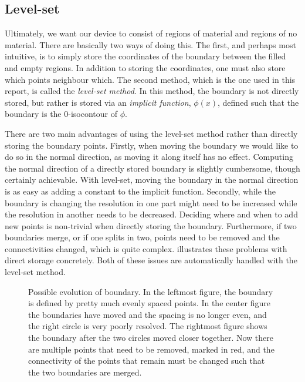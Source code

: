 

\subsection{Level-set}\label{sec:level-set}

Ultimately, we want our device to consist of regions of material and regions of
no material.
There are basically two ways of doing this.
The first, and perhaps most intuitive,
is to simply store the coordinates of the boundary between the filled and empty
regions.
In addition to storing the coordinates, one must also store which points
neighbour which.
The second method, which is the one used in this report, is called
the \emph{level-set method}.
In this method, the boundary is not directly stored, but rather is stored via an
\emph{implicit function}, $\phi(x)$, defined such that the boundary is the
0-isocontour of $\phi$.

There are two main advantages of using the level-set method rather than
directly storing the boundary points.
Firstly, when moving the boundary we would like to do so in the normal
direction, as moving it along itself has no effect.
Computing the normal direction of a directly stored boundary is slightly cumbersome,
though certainly achievable.
With level-set, moving the boundary in the normal direction is as easy as adding
a constant to the implicit function.
Secondly, while the boundary is changing the resolution in one part might need
to be increased while the resolution in another needs to be decreased. Deciding
where and when to add new points is non-trivial when directly storing the
boundary. Furthermore, if two boundaries merge, or if one splits in two, points
need to be removed and the connectivities changed, which is quite complex.
 illustrates these problems with direct storage concretely.
Both of these issues are automatically handled with the level-set method.

\begin{figure}[htpb]
	\centering
	
	\caption{%
		Possible evolution of boundary. In the leftmost figure, the
		boundary is defined by pretty much evenly spaced points. In the center figure
		the boundaries have moved and the spacing is no longer even, and the
		right circle is very poorly resolved.
		The rightmost figure shows the boundary after the two circles moved
		closer together. Now there are multiple points that need to be removed,
		marked in red, and the connectivity of the points that remain must be
		changed such that the two boundaries are merged.
	}
	\label{fig:direct_troubles}
\end{figure}

